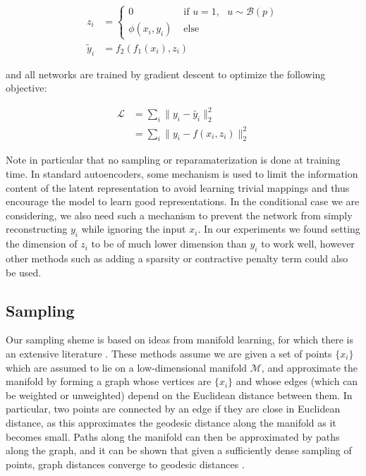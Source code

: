 \documentclass{article}
\begin{document}
\begin{align*}
  z_i &=
  \begin{cases}
    0 & \mbox{   if   } u = 1, \mbox{   } u \sim \mathcal{B}(p) \\
    \phi(x_i, y_i) & \mbox{   else }
  \end{cases} \\
\tilde{y}_i &= f_2(f_1(x_i), z_i)
\end{align*}

and all networks are trained by gradient descent to optimize the following objective:

\begin{align}
  \mathcal{L} &= \sum_i \|y_i - \tilde{y_i} \|_2^2 \\
  &= \sum_i \|y_i - f(x_i, z_i) \|_2^2
\end{align}

Note in particular that no sampling or reparamaterization is done at training time.
In standard autoencoders, some mechanism is used to limit the information content of the latent representation to avoid learning trivial mappings and thus encourage the model to learn good representations.
In the conditional case we are considering, we also need such a mechanism to prevent the network from simply reconstructing $y_i$ while ignoring the input $x_i$.
In our experiments we found setting the dimension of $z_i$ to be of much lower dimension than $y_i$ to work well, however other methods such as adding a sparsity or contractive penalty term could also be used.


\subsection{Sampling}

Our sampling sheme is based on ideas from manifold learning, for which there is an extensive literature \citep{isomap, LLE, Belkin2003, TSNE}.
These methods assume we are given a set of points $\{x_i\}$ which are assumed to lie on a low-dimensional manifold $\mathcal{M}$, and approximate the manifold by forming a graph whose vertices are $\{x_i\}$ and whose edges (which can be weighted or unweighted) depend on the Euclidean distance between them. In particular, two points are connected by an edge if they are close in Euclidean distance, as this approximates the geodesic distance along the manifold as it becomes small.
Paths along the manifold can then be approximated by paths along the graph, and it can be shown that given a sufficiently dense sampling of points, graph distances converge to geodesic distances \citep{Bernstein2000}.
\end{document}
